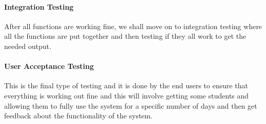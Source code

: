 \documentclass{article}
\begin{document}
\paragraph{Integration Testing \\}
After all functions are working fine, we shall move on to integration testing where all the functions are put together and then testing if they all work to get the needed output.

\paragraph{User Acceptance Testing \\}
This is the final type of testing and it is done by the end users to ensure that everything is working out fine and this will involve getting some students and allowing them to fully use the system for a specific number of days and then get feedback about the functionality of the system. 


\end{document}
